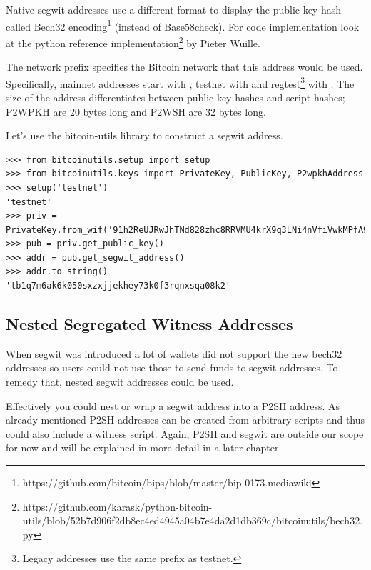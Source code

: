 Native segwit addresses use a different format to display the public key hash called Bech32 encoding\footnote{https://github.com/bitcoin/bips/blob/master/bip-0173.mediawiki} (instead of Base58check). For code implementation look at the python reference implementation\footnote{https://github.com/karask/python-bitcoin-utils/blob/52b7d906f2db8ec4ed4945a04b7e4da2d1db369c/bitcoinutils/bech32.py} by Pieter Wuille.

The network prefix specifies the Bitcoin network that this address would be used. Specifically, mainnet addresses start with , testnet with  and regtest\footnote{Legacy addresses use the same prefix as testnet.} with . The size of the address differentiates between public key hashes and script hashes; P2WPKH are 20 bytes long and P2WSH are 32 bytes long.

Let's use the bitcoin-utils library to construct a segwit address.

\vspace{1em}
\begin{lstlisting}[style=Python,label={lst:display-segwit-address},caption={Example of displaying a segwit address from a public key using Python},captionpos=b]
>>> from bitcoinutils.setup import setup
>>> from bitcoinutils.keys import PrivateKey, PublicKey, P2wpkhAddress
>>> setup('testnet')
'testnet' 
>>> priv = PrivateKey.from_wif('91h2ReUJRwJhTNd828zhc8RRVMU4krX9q3LNi4nVfiVwkMPfA9p')
>>> pub = priv.get_public_key()  
>>> addr = pub.get_segwit_address()
>>> addr.to_string() 
'tb1q7m6ak6k050sxzxjjekhey73k0f3rqnxsqa08k2'
\end{lstlisting}
\vspace{1em}



\subsection*{Nested Segregated Witness Addresses}

When segwit was introduced a lot of wallets did not support the new bech32 addresses so users could not use those to send funds to segwit addresses. To remedy that, nested segwit addresses could be used.

Effectively you could nest or wrap a segwit address into a P2SH address. As already mentioned P2SH addresses can be created from arbitrary scripts and thus could also include a witness script. Again, P2SH and segwit are outside our scope for now and will be explained in more detail in a later chapter.

